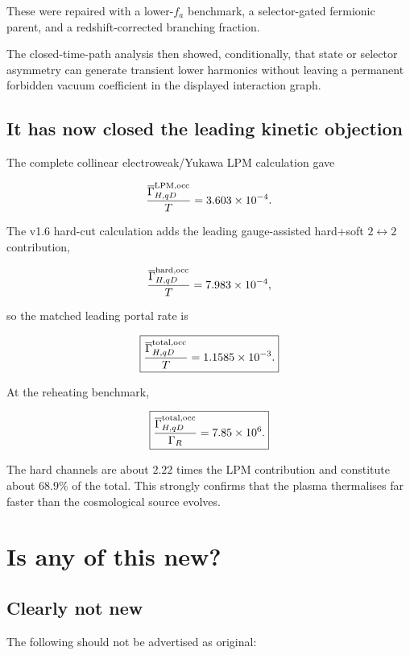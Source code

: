 \documentclass[
  10pt,
]{article}
\begin{document}
These were repaired with a lower-\(f_a\) benchmark, a selector-gated
fermionic parent, and a redshift-corrected branching fraction.

The closed-time-path analysis then showed, conditionally, that state or
selector asymmetry can generate transient lower harmonics without
leaving a permanent forbidden vacuum coefficient in the displayed
interaction graph.

\subsection{It has now closed the leading kinetic
objection}\label{it-has-now-closed-the-leading-kinetic-objection}

The complete collinear electroweak/Yukawa LPM calculation gave

\[
\frac{\overline\Gamma_{H,qD}^{\rm LPM,occ}}{T}
=
3.603\times10^{-4}.
\]

The v1.6 hard-cut calculation adds the leading gauge-assisted hard+soft
\(2\leftrightarrow2\) contribution,

\[
\frac{\overline\Gamma_{H,qD}^{\rm hard,occ}}{T}
=
7.983\times10^{-4},
\]

so the matched leading portal rate is

\[
\boxed{
\frac{\overline\Gamma_{H,qD}^{\rm total,occ}}{T}
=
1.1585\times10^{-3}.
}
\]

At the reheating benchmark,

\[
\boxed{
\frac{\overline\Gamma_{H,qD}^{\rm total,occ}}
{\Gamma_R}
=
7.85\times10^6.
}
\]

The hard channels are about \(2.22\) times the LPM contribution and
constitute about \(68.9\%\) of the total. This strongly confirms that
the plasma thermalises far faster than the cosmological source evolves.

\section{Is any of this new?}\label{is-any-of-this-new}

\subsection{Clearly not new}\label{clearly-not-new}

The following should not be advertised as original:
\end{document}
